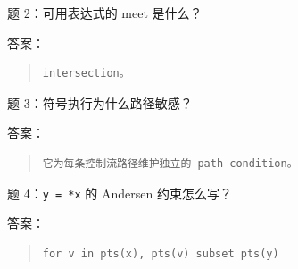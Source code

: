 \documentclass[UTF8,zihao=-4]{ctexart}
\begin{document}
题 2：可用表达式的 meet 是什么？


答案：


\begin{quote}
\footnotesize
\begin{verbatim}
intersection。
\end{verbatim}
\end{quote}


题 3：符号执行为什么路径敏感？


答案：


\begin{quote}
\footnotesize
\begin{verbatim}
它为每条控制流路径维护独立的 path condition。
\end{verbatim}
\end{quote}


题 4：\texttt{y = *x} 的 Andersen 约束怎么写？


答案：


\begin{quote}
\footnotesize
\begin{verbatim}
for v in pts(x), pts(v) subset pts(y)
\end{verbatim}
\end{quote}
\end{document}
